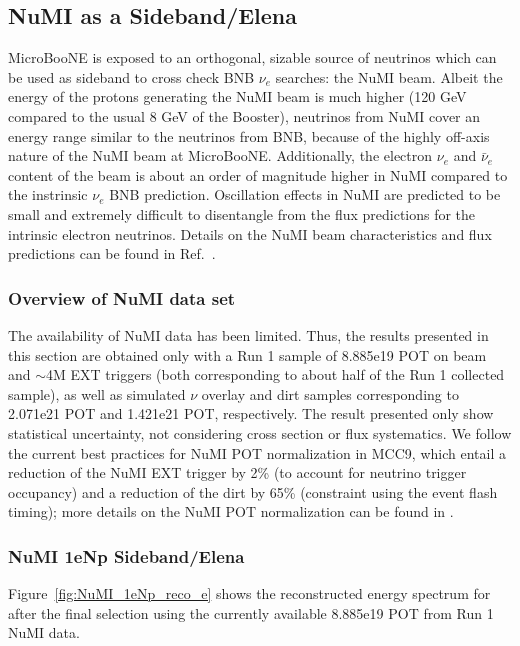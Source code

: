 \subsection{NuMI as a Sideband/Elena}
MicroBooNE is exposed to an orthogonal, sizable source of neutrinos which can be used as sideband to cross check BNB $\nu_e$ searches: the NuMI beam.  Albeit the energy of the protons generating the NuMI beam is much higher (120 GeV compared to the usual 8 GeV of the Booster),  neutrinos from NuMI cover an energy range similar to the neutrinos from BNB, because of the highly off-axis nature of the NuMI beam at MicroBooNE. Additionally, the electron $\nu_e$ and $\bar\nu_e$ content of the beam is about an order of magnitude higher in NuMI compared to the instrinsic $\nu_e$ BNB prediction.  
Oscillation effects in NuMI are predicted to be small and extremely difficult to disentangle from the flux predictions for the intrinsic electron neutrinos. Details on the NuMI beam characteristics and flux predictions can be found in Ref.~\cite{bib:NuMIFlux}.

\subsubsection{Overview of NuMI data set}
The availability of NuMI data has been limited. Thus, the results presented in this section are obtained only with a Run 1 sample of 8.885e19 POT on beam and $\sim$4M EXT triggers (both corresponding to about half of the  Run 1 collected sample), as well as simulated $\nu$ overlay and dirt samples corresponding to 2.071e21 POT  and 1.421e21 POT, respectively. The result presented only show statistical uncertainty, not considering cross section or flux systematics. We follow the current best practices for NuMI POT normalization in MCC9, which entail a reduction of the NuMI EXT trigger by 2\% (to account for neutrino trigger occupancy) and a reduction of the dirt by 65\% (constraint using the event flash timing); more details on the NuMI POT normalization can be found in \cite{bib:NuMINorm}. 


\subsubsection{NuMI 1eNp Sideband/Elena}
Figure~\ref{fig:NuMI_1eNp_reco_e} shows the reconstructed energy spectrum for \npsel after the final \npsel selection using the currently available 8.885e19  POT from Run 1 NuMI data.

